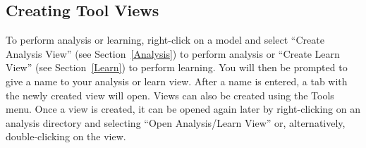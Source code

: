 \documentclass[titlepage,11pt]{article}
\begin{document}


\subsection{Creating Tool Views}

\noindent
To perform analysis or learning, right-click on a model and select ``Create Analysis View'' (see Section~\ref{Analysis}) to perform analysis or ``Create Learn View'' (see Section~\ref{Learn}) to perform learning. You will then be prompted to give a name to your analysis or learn view. After a name is entered, a tab with the newly created view will open.  Views can also be created using the Tools menu.  Once a view is created, it can be opened again later by right-clicking on an analysis directory and selecting ``Open Analysis/Learn View'' or, alternatively, double-clicking on the view.

\end{document}
